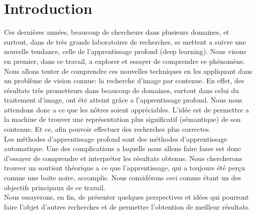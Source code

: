 
\chapter{Introduction} %

Ces dernières années, beaucoup de chercheurs dans plusieurs domaines, et surtout, dans de très grands laboratoires de recherches, se mettent a suivre une nouvelle tendance, celle de l'apprentissage profond (deep learning). Nous visons en premier, dans ce travail, a explorer et essayer de comprendre ce phénomène.\\

Nous allons tenter de comprendre ces nouvelles techniques en les appliquant dans un problème de vision connue: la recherche d'image par contenue. En effet, des résultats très prometteurs dans beaucoup de domaines, surtout dans celui du traitement d'image, ont été atteint  grâce a l'apprentissage profond. Nous nous attendons donc a ce que les nôtres soient appréciables. L’idée est de permettre a la machine de trouver une représentation plus significatif (sémantique) de son contenue. Et ce, afin pouvoir effectuer des recherches plus correctes.\\

Les méthodes d’apprentissage profond sont des méthodes d'apprentissage automatique. Une des complications a laquelle nous allons faire fasse est donc d'essayer de comprendre et interpréter les résultats obtenus. Nous chercherons trouver un soutient théorique a ce que l'apprentissage, qui a toujours été perçu comme une boite noire, accomplis. Nous considérons ceci comme étant un des objectifs principaux de ce travail.\\

Nous essayerons, en fin, de présenter quelques perspectives et idées qui pourront faire l'objet d'autres recherches et de permettre l'obtention de meilleur résultats.
